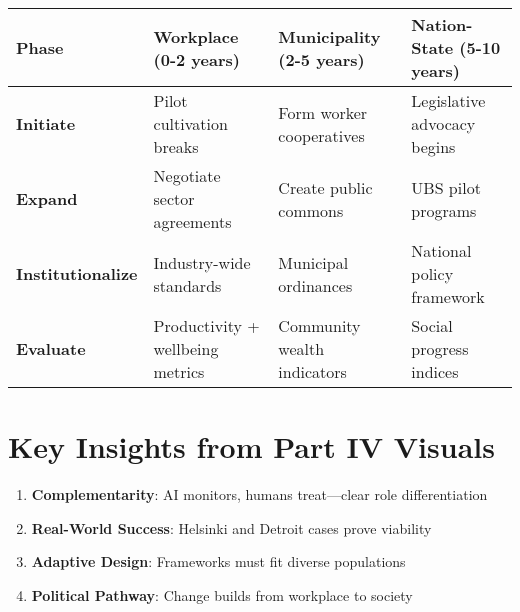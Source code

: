 \documentclass[
  a4paper,
]{report}
\providecommand{\tightlist}{%
  \setlength{\itemsep}{0pt}\setlength{\parskip}{0pt}}
\begin{document}
\begin{longtable}[]{@{}
  >{\raggedright\arraybackslash}p{}
  >{\raggedright\arraybackslash}p{}
  >{\raggedright\arraybackslash}p{}
  >{\raggedright\arraybackslash}p{}@{}}
\toprule\noalign{}
\begin{minipage}[b]{\linewidth}\raggedright
Phase
\end{minipage} & \begin{minipage}[b]{\linewidth}\raggedright
Workplace (0-2 years)
\end{minipage} & \begin{minipage}[b]{\linewidth}\raggedright
Municipality (2-5 years)
\end{minipage} & \begin{minipage}[b]{\linewidth}\raggedright
Nation-State (5-10 years)
\end{minipage} \\
\midrule\noalign{}
\endhead
\bottomrule\noalign{}
\endlastfoot
\textbf{Initiate} & Pilot cultivation breaks & Form worker cooperatives
& Legislative advocacy begins \\
\textbf{Expand} & Negotiate sector agreements & Create public commons &
UBS pilot programs \\
\textbf{Institutionalize} & Industry-wide standards & Municipal
ordinances & National policy framework \\
\textbf{Evaluate} & Productivity + wellbeing metrics & Community wealth
indicators & Social progress indices \\
\end{longtable}

\section{Key Insights from Part IV
Visuals}\label{key-insights-from-part-iv-visuals}

\begin{enumerate}
\def\labelenumi{\arabic{enumi}.}
\tightlist
\item
  \textbf{Complementarity}: AI monitors, humans treat---clear role
  differentiation
\item
  \textbf{Real-World Success}: Helsinki and Detroit cases prove
  viability
\item
  \textbf{Adaptive Design}: Frameworks must fit diverse populations
\item
  \textbf{Political Pathway}: Change builds from workplace to society
\end{enumerate}
\end{document}

